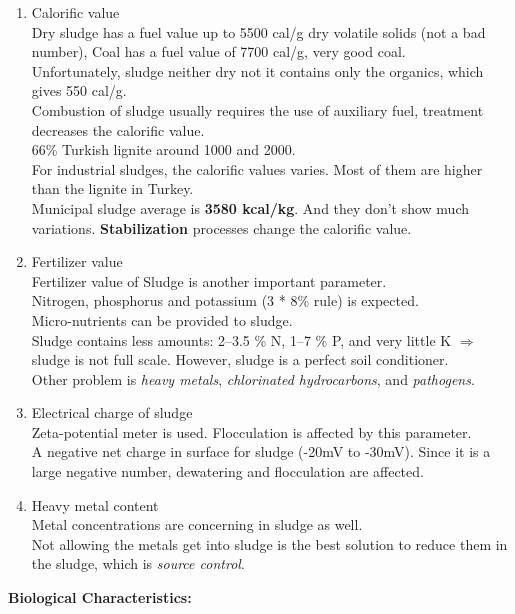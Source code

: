 \documentclass{article}
\numberwithin{equation}{section}
\begin{document}
\begin{enumerate}
    \item Calorific value\\
    Dry sludge has a fuel value up to 5500 cal/g dry volatile solids (not a bad number), Coal has a fuel value of 7700 cal/g, very good coal.\\
    Unfortunately, sludge neither dry not it contains only the organics, which gives 550 cal/g.\\
    Combustion of sludge usually requires the use of auxiliary fuel, treatment decreases the calorific value.\\
    66\% Turkish lignite around 1000 and 2000.\\
    For industrial sludges, the calorific values varies. Most of them are higher than the lignite in Turkey.\\
    Municipal sludge average is \textbf{3580 kcal/kg}. And they don't show much variations. \textbf{Stabilization} processes change the calorific value.
    \item Fertilizer value\\
    Fertilizer value of Sludge is another important parameter.\\
    Nitrogen, phosphorus and potassium (3 * 8\% rule) is expected.\\
    Micro-nutrients can be provided to sludge.\\
    Sludge contains less amounts: 2--3.5 \% N, 1--7 \% P, and very little K $\Rightarrow$ sludge is not full scale. However, sludge is a perfect soil conditioner.\\
    Other problem is \emph{heavy metals}, \emph{chlorinated hydrocarbons}, and \emph{pathogens}.
    \item Electrical charge of sludge\\
    Zeta-potential meter is used. Flocculation is affected by this parameter.\\
    A negative net charge in surface for sludge (-20mV to -30mV). Since it is a large negative number, dewatering and flocculation are affected.
    \item Heavy metal content\\
    Metal concentrations are concerning in sludge as well.\\
    Not allowing the metals get into sludge is the best solution to reduce them in the sludge, which is \emph{source control}.
\end{enumerate}
\textbf{Biological Characteristics:}\\
\end{document}
